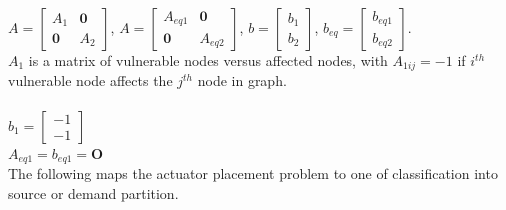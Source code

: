 \documentclass[authoryear,preprint,review,12pt]{elsarticle}
\begin{document}
$A=\left[\begin{array}{cc}
A_{1} & \mathbf{0}\\
\mathbf{0} & A_{2}
\end{array}\right]$, $A=\left[\begin{array}{cc}
A_{eq1} & \mathbf{0}\\
\mathbf{0} & A_{eq2}
\end{array}\right]$, $b=\left[\begin{array}{c}
b_{1}\\
b_{2}
\end{array}\right]$, $b_{eq}=\left[\begin{array}{c}
b_{eq1}\\
b_{eq2}
\end{array}\right]$.\\

$A_{1}$ is a matrix of vulnerable nodes versus affected nodes, with
$A_{1ij}=-1$ if $i^{th}$ vulnerable node affects the $j^{th}$ node
in graph.\\ %


\\


$b_{1}=\left[\begin{array}{c}
-1\\
-1
\end{array}\right]$\\



$A_{eq1}=b_{eq1}=\mathbf{O}$\\

The following maps the actuator placement problem to one of classification
into source or demand partition.
\end{document}
